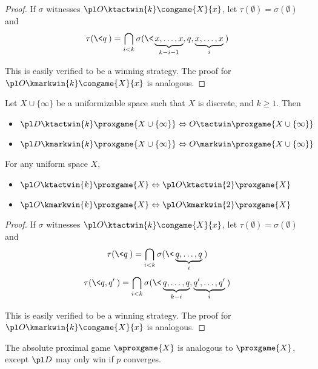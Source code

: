 \begin{proof}
  If $\sigma$ witnesses $\pl O\ktactwin{k}\congame{X}{x}$, let $\tau(\emptyset)=\sigma(\emptyset)$ and
    \[
      \tau(\<q\>)
        =
      \bigcap_{i< k}
      \sigma(\<\underbrace{x,\dots,x}_{k-i-1},q,\underbrace{x,\dots,x}_{i}\>)
    \]

  This is easily verified to be a winning strategy. The proof for $\pl O\kmarkwin{k}\congame{X}{x}$ is analogous.
\end{proof}

\begin{cor}
  Let $X\cup\{\infty\}$ be a uniformizable space such that $X$ is discrete, and $k\geq 1$. Then
  \begin{itemize}
    \item
      $\pl D\ktactwin{k}\proxgame{X\cup\{\infty\}} \Leftrightarrow O\tactwin\proxgame{X\cup\{\infty\}}$
    \item
      $\pl D\kmarkwin{k}\proxgame{X\cup\{\infty\}} \Leftrightarrow O\markwin\proxgame{X\cup\{\infty\}}$
  \end{itemize}
\end{cor}

\begin{prop} For any uniform space $X$,
  \begin{itemize}
    \item
      $\pl O\ktactwin{k}\proxgame{X} \Leftrightarrow \pl O\ktactwin{2}\proxgame{X}$
    \item
      $\pl O\kmarkwin{k}\proxgame{X} \Leftrightarrow \pl O\kmarkwin{2}\proxgame{X}$
  \end{itemize}
\end{prop}

\begin{proof}
  If $\sigma$ witnesses $\pl O\ktactwin{k}\congame{X}{x}$, let $\tau(\emptyset)=\sigma(\emptyset)$ and
    \[
      \tau(\<q\>)
        =
      \bigcap_{i<k}
      \sigma(\<\underbrace{q,\dots,q}_{i}\>)
    \]
    \[
      \tau(\<q,q'\>)
        =
      \bigcap_{i< k}
      \sigma(\<\underbrace{q,\dots,q}_{k-i},\underbrace{q',\dots,q'}_{i}\>)
    \]

  This is easily verified to be a winning strategy. The proof for $\pl O\kmarkwin{k}\congame{X}{x}$ is analogous.
\end{proof}

\newpage

\begin{defn}
  The absolute proximal game $\aproxgame{X}$ is analogous to $\proxgame{X}$, except $\pl D$ may only win if $p$ converges.
\end{defn}


